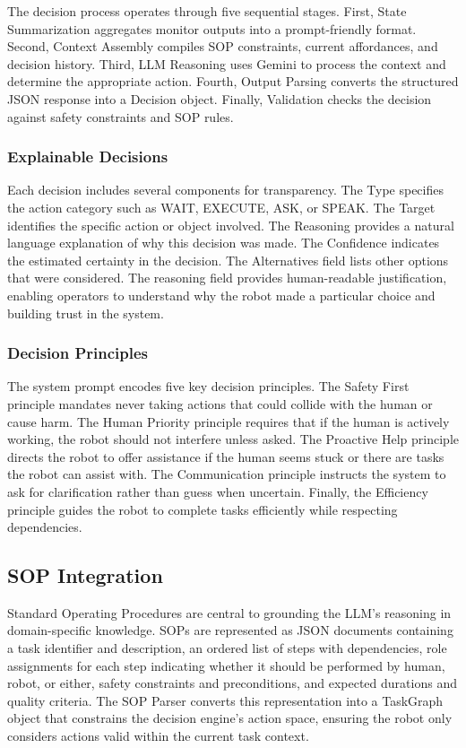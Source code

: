 The decision process operates through five sequential stages. First, State Summarization aggregates monitor outputs into a prompt-friendly format. Second, Context Assembly compiles SOP constraints, current affordances, and decision history. Third, LLM Reasoning uses Gemini to process the context and determine the appropriate action. Fourth, Output Parsing converts the structured JSON response into a Decision object. Finally, Validation checks the decision against safety constraints and SOP rules.

\subsubsection{Explainable Decisions}

Each decision includes several components for transparency. The Type specifies the action category such as WAIT, EXECUTE, ASK, or SPEAK. The Target identifies the specific action or object involved. The Reasoning provides a natural language explanation of why this decision was made. The Confidence indicates the estimated certainty in the decision. The Alternatives field lists other options that were considered. The reasoning field provides human-readable justification, enabling operators to understand why the robot made a particular choice and building trust in the system.

\subsubsection{Decision Principles}

The system prompt encodes five key decision principles. The Safety First principle mandates never taking actions that could collide with the human or cause harm. The Human Priority principle requires that if the human is actively working, the robot should not interfere unless asked. The Proactive Help principle directs the robot to offer assistance if the human seems stuck or there are tasks the robot can assist with. The Communication principle instructs the system to ask for clarification rather than guess when uncertain. Finally, the Efficiency principle guides the robot to complete tasks efficiently while respecting dependencies.

\subsection{SOP Integration}

Standard Operating Procedures are central to grounding the LLM's reasoning in domain-specific knowledge. SOPs are represented as JSON documents containing a task identifier and description, an ordered list of steps with dependencies, role assignments for each step indicating whether it should be performed by human, robot, or either, safety constraints and preconditions, and expected durations and quality criteria. The SOP Parser converts this representation into a TaskGraph object that constrains the decision engine's action space, ensuring the robot only considers actions valid within the current task context.

